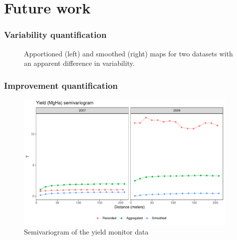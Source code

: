 \documentclass{beamer}
\begin{document}
\section{Future work}

\begin{frame}
  \frametitle{Variability quantification}


  \begin{figure}

    \caption{Apportioned (left) and smoothed (right) maps for two
      datasets with an apparent difference in variability.}
  \end{figure}
  
\end{frame}

\begin{frame}
  \frametitle{Improvement quantification}

  \begin{figure}
    \includegraphics[width=0.95\textwidth]{./figures/semivariogram.pdf}
    \caption{Semivariogram of the yield monitor data}
  \end{figure}

\end{frame}
\end{document}
